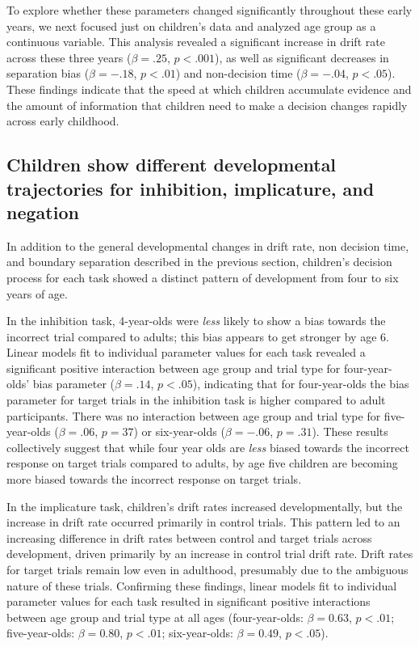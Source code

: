 \documentclass[man, noapacite]{apa2}
\begin{document}
To explore whether these parameters changed significantly throughout these early years, we next focused just on children's data and analyzed age group as a continuous variable. This analysis revealed a significant increase in drift rate across these three years ($\beta = .25$, $p < .001$), as well as significant decreases in separation bias ($\beta = -.18$, $p < .01$) and non-decision time ($\beta = -.04$, $p < .05$). These findings indicate that the speed at which children accumulate evidence and the amount of information that children need to make a decision changes rapidly across early childhood.

\subsection{Children show different developmental trajectories for inhibition, implicature, and negation}

In addition to the general developmental changes in drift rate, non decision time, and boundary separation described in the previous section, children's decision process for each task showed a distinct pattern of development from four to six years of age.

In the inhibition task, 4-year-olds were \emph{less} likely to show a bias towards the incorrect trial compared to adults; this bias appears to get stronger by age 6. Linear models fit to individual parameter values for each task revealed a significant positive interaction between age group and trial type for four-year-olds' bias parameter ($\beta = .14$, $p< .05$), indicating that for four-year-olds the bias parameter for target trials in the inhibition task is higher compared to adult participants. There was no interaction between age group and trial type for five-year-olds ($\beta = .06$, $p = 37$) or six-year-olds ($\beta = -.06$, $p = .31$). These results collectively suggest that while four year olds are \emph{less} biased towards the incorrect response on target trials compared to adults, by age five children are becoming more biased towards the incorrect response on target trials.

In the implicature task, children's drift rates increased developmentally, but the increase in drift rate occurred primarily in control trials. This pattern led to an increasing difference in drift rates between control and target trials across development, driven primarily by an increase in control trial drift rate. Drift rates for target trials remain low even in adulthood, presumably due to the ambiguous nature of these trials. Confirming these findings, linear models fit to individual parameter values for each task resulted in significant positive interactions between age group and trial type at all ages (four-year-olds: $\beta = 0.63$, $p <.01$; five-year-olds: $\beta = 0.80$, $p <.01$; six-year-olds: $\beta = 0.49$, $p <.05$).
\end{document}

